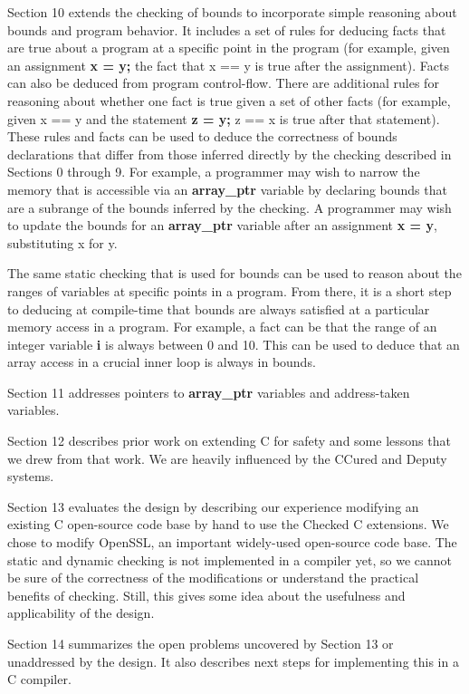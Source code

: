 \documentclass[]{article}
\begin{document}
Section 10 extends the checking of bounds to incorporate simple
reasoning about bounds and program behavior. It includes a set of rules
for deducing facts that are true about a program at a specific point in
the program (for example, given an assignment \textbf{x = y;} the fact
that x == y is true after the assignment). Facts can also be deduced
from program control-flow. There are additional rules for reasoning
about whether one fact is true given a set of other facts (for example,
given x == y and the statement \textbf{z = y;} z == x is true after that
statement). These rules and facts can be used to deduce the correctness
of bounds declarations that differ from those inferred directly by the
checking described in Sections 0 through 9. For example, a programmer
may wish to narrow the memory that is accessible via an
\textbf{array\_ptr} variable by declaring bounds that are a subrange of
the bounds inferred by the checking. A programmer may wish to update the
bounds for an \textbf{array\_ptr} variable after an assignment \textbf{x
= y}, substituting x for y.

The same static checking that is used for bounds can be used to reason
about the ranges of variables at specific points in a program. From
there, it is a short step to deducing at compile-time that bounds are
always satisfied at a particular memory access in a program. For
example, a fact can be that the range of an integer variable \textbf{i}
is always between 0 and 10. This can be used to deduce that an array
access in a crucial inner loop is always in bounds.

Section 11 addresses pointers to \textbf{array\_ptr} variables and
address-taken variables.

Section 12 describes prior work on extending C for safety and some
lessons that we drew from that work. We are heavily influenced by the
CCured and Deputy systems.

Section 13 evaluates the design by describing our experience modifying
an existing C open-source code base by hand to use the Checked C
extensions. We chose to modify OpenSSL, an important widely-used
open-source code base. The static and dynamic checking is not
implemented in a compiler yet, so we cannot be sure of the correctness
of the modifications or understand the practical benefits of checking.
Still, this gives some idea about the usefulness and applicability of
the design.

Section 14 summarizes the open problems uncovered by Section 13 or
unaddressed by the design. It also describes next steps for implementing
this in a C compiler.
\end{document}
